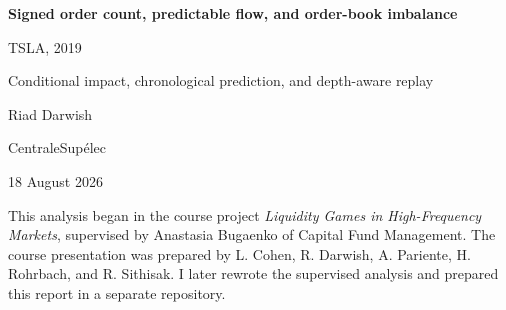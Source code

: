 \documentclass[11pt,a4paper]{article}
\begin{document}
\thispagestyle{plain}
\begin{center}
  {\LARGE\bfseries Signed order count, predictable flow, and order-book imbalance\par}
  \vspace{1.5mm}
  {\Large TSLA, 2019\par}
  \vspace{4mm}
  {\large Conditional impact, chronological prediction, and depth-aware replay\par}
  \vspace{6mm}
  {\large Riad Darwish\par}
  {\normalsize CentraleSup\'elec\par}
  {\normalsize 18 August 2026\par}
\end{center}

\vspace{3mm}
\begin{center}
\begin{minipage}{0.92\textwidth}
\small
This analysis began in the course project \emph{Liquidity Games in
High-Frequency Markets}, supervised by Anastasia Bugaenko of Capital Fund
Management. The course presentation was prepared by L. Cohen, R. Darwish,
A. Pariente, H. Rohrbach, and R. Sithisak. I later rewrote the supervised
analysis and prepared this report in a separate repository.
\end{minipage}
\end{center}
\end{document}
